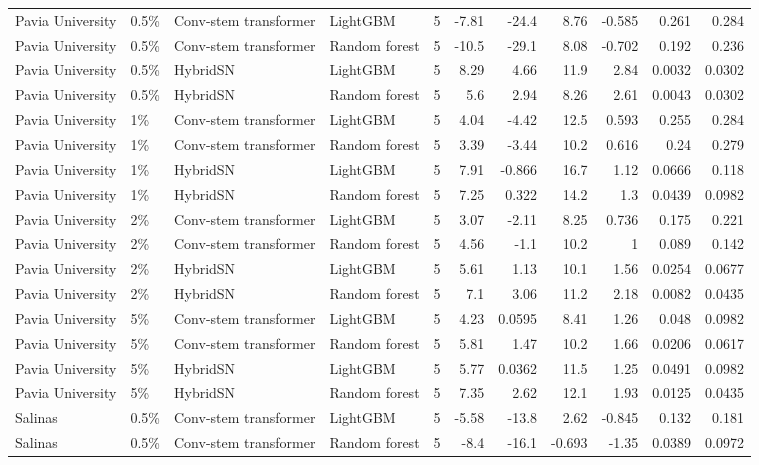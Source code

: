 \begin{table}
\begin{tabular}{llllrrrrrrr}
Pavia University & 0.5\% & Conv-stem transformer & LightGBM & 5 & -7.81 & -24.4 & 8.76 & -0.585 & 0.261 & 0.284 \\
Pavia University & 0.5\% & Conv-stem transformer & Random forest & 5 & -10.5 & -29.1 & 8.08 & -0.702 & 0.192 & 0.236 \\
Pavia University & 0.5\% & HybridSN & LightGBM & 5 & 8.29 & 4.66 & 11.9 & 2.84 & 0.0032 & 0.0302 \\
Pavia University & 0.5\% & HybridSN & Random forest & 5 & 5.6 & 2.94 & 8.26 & 2.61 & 0.0043 & 0.0302 \\
Pavia University & 1\% & Conv-stem transformer & LightGBM & 5 & 4.04 & -4.42 & 12.5 & 0.593 & 0.255 & 0.284 \\
Pavia University & 1\% & Conv-stem transformer & Random forest & 5 & 3.39 & -3.44 & 10.2 & 0.616 & 0.24 & 0.279 \\
Pavia University & 1\% & HybridSN & LightGBM & 5 & 7.91 & -0.866 & 16.7 & 1.12 & 0.0666 & 0.118 \\
Pavia University & 1\% & HybridSN & Random forest & 5 & 7.25 & 0.322 & 14.2 & 1.3 & 0.0439 & 0.0982 \\
Pavia University & 2\% & Conv-stem transformer & LightGBM & 5 & 3.07 & -2.11 & 8.25 & 0.736 & 0.175 & 0.221 \\
Pavia University & 2\% & Conv-stem transformer & Random forest & 5 & 4.56 & -1.1 & 10.2 & 1 & 0.089 & 0.142 \\
Pavia University & 2\% & HybridSN & LightGBM & 5 & 5.61 & 1.13 & 10.1 & 1.56 & 0.0254 & 0.0677 \\
Pavia University & 2\% & HybridSN & Random forest & 5 & 7.1 & 3.06 & 11.2 & 2.18 & 0.0082 & 0.0435 \\
Pavia University & 5\% & Conv-stem transformer & LightGBM & 5 & 4.23 & 0.0595 & 8.41 & 1.26 & 0.048 & 0.0982 \\
Pavia University & 5\% & Conv-stem transformer & Random forest & 5 & 5.81 & 1.47 & 10.2 & 1.66 & 0.0206 & 0.0617 \\
Pavia University & 5\% & HybridSN & LightGBM & 5 & 5.77 & 0.0362 & 11.5 & 1.25 & 0.0491 & 0.0982 \\
Pavia University & 5\% & HybridSN & Random forest & 5 & 7.35 & 2.62 & 12.1 & 1.93 & 0.0125 & 0.0435 \\
Salinas & 0.5\% & Conv-stem transformer & LightGBM & 5 & -5.58 & -13.8 & 2.62 & -0.845 & 0.132 & 0.181 \\
Salinas & 0.5\% & Conv-stem transformer & Random forest & 5 & -8.4 & -16.1 & -0.693 & -1.35 & 0.0389 & 0.0972 \\

\end{tabular}
\end{table}
